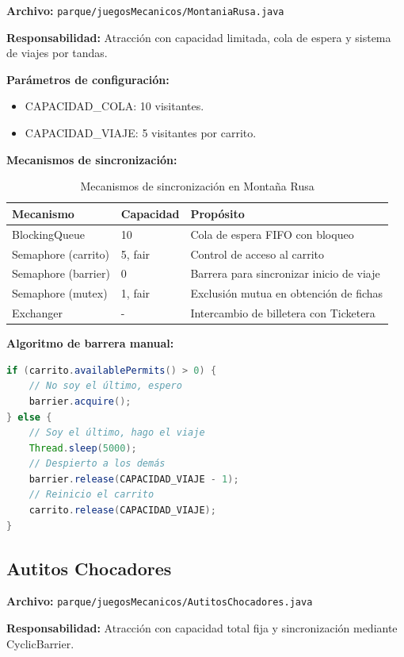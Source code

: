 \documentclass[12pt,a4paper]{article}
\begin{document}
\textbf{Archivo:} \texttt{parque/juegosMecanicos/MontaniaRusa.java}

\textbf{Responsabilidad:} Atracción con capacidad limitada, cola de espera y sistema de viajes por tandas.

\textbf{Parámetros de configuración:}
\begin{itemize}
    \item CAPACIDAD\_COLA: 10 visitantes.
    \item CAPACIDAD\_VIAJE: 5 visitantes por carrito.
\end{itemize}

\textbf{Mecanismos de sincronización:}

\begin{table}[H]
\centering
\begin{tabular}{|l|l|p{7cm}|}
\hline
\textbf{Mecanismo} & \textbf{Capacidad} & \textbf{Propósito} \\
\hline
BlockingQueue & 10 & Cola de espera FIFO con bloqueo \\
\hline
Semaphore (carrito) & 5, fair & Control de acceso al carrito \\
\hline
Semaphore (barrier) & 0 & Barrera para sincronizar inicio de viaje \\
\hline
Semaphore (mutex) & 1, fair & Exclusión mutua en obtención de fichas \\
\hline
Exchanger & - & Intercambio de billetera con Ticketera \\
\hline
\end{tabular}
\caption{Mecanismos de sincronización en Montaña Rusa}
\end{table}

\textbf{Algoritmo de barrera manual:}
\begin{lstlisting}[language=Java]
if (carrito.availablePermits() > 0) {
    // No soy el último, espero
    barrier.acquire();
} else {
    // Soy el último, hago el viaje
    Thread.sleep(5000);
    // Despierto a los demás
    barrier.release(CAPACIDAD_VIAJE - 1);
    // Reinicio el carrito
    carrito.release(CAPACIDAD_VIAJE);
}
\end{lstlisting}

\subsection{Autitos Chocadores}

\textbf{Archivo:} \texttt{parque/juegosMecanicos/AutitosChocadores.java}

\textbf{Responsabilidad:} Atracción con capacidad total fija y sincronización mediante CyclicBarrier.
\end{document}
